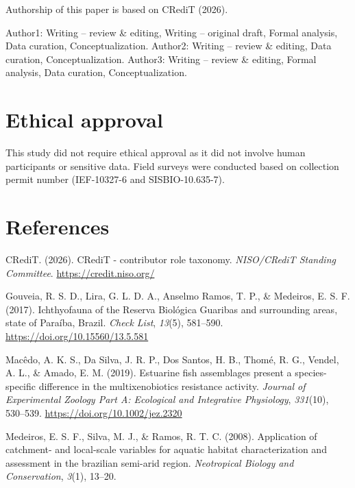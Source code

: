 \documentclass[
  american,
  letterpaper,
  DIV=11,
  numbers=noendperiod]{scrartcl}
\newlength{\cslhangindent}
\newenvironment{CSLReferences}[2] %
 {\begin{list}{}{%
  \setlength{\itemindent}{0pt}
  \setlength{\leftmargin}{0pt}
  \setlength{\parsep}{0pt}
  \ifodd #1
   \setlength{\leftmargin}{\cslhangindent}
   \setlength{\itemindent}{-1\cslhangindent}
  \fi
  \setlength{\itemsep}{#2\baselineskip}}}
 {\end{list}}
\begin{document}
Authorship of this paper is based on CRediT (2026).

Author1: Writing -- review \& editing, Writing -- original draft, Formal
analysis, Data curation, Conceptualization. Author2: Writing -- review
\& editing, Data curation, Conceptualization. Author3: Writing -- review
\& editing, Formal analysis, Data curation, Conceptualization.

\section*{Ethical approval}\label{ethical-approval}

This study did not require ethical approval as it did not involve human
participants or sensitive data. Field surveys were conducted based on
collection permit number (IEF-10327-6 and SISBIO-10.635-7).

\section*{References}\label{references}

\label{refs}
\begin{CSLReferences}{1}{0}
CRediT. (2026). CRediT - contributor role taxonomy. \emph{NISO/CRediT
Standing Committee}. \url{https://credit.niso.org/}

Gouveia, R. S. D., Lira, G. L. D. A., Anselmo Ramos, T. P., \& Medeiros,
E. S. F. (2017). Ichthyofauna of the Reserva Biológica Guaribas and
surrounding areas, state of Paraíba, Brazil. \emph{Check List},
\emph{13}(5), 581--590. \url{https://doi.org/10.15560/13.5.581}

Macêdo, A. K. S., Da Silva, J. R. P., Dos Santos, H. B., Thomé, R. G.,
Vendel, A. L., \& Amado, E. M. (2019). Estuarine fish assemblages
present a species{-}specific difference in the multixenobiotics
resistance activity. \emph{Journal of Experimental Zoology Part A:
Ecological and Integrative Physiology}, \emph{331}(10), 530--539.
\url{https://doi.org/10.1002/jez.2320}

Medeiros, E. S. F., Silva, M. J., \& Ramos, R. T. C. (2008). Application
of catchment- and local-scale variables for aquatic habitat
characterization and assessment in the brazilian semi-arid region.
\emph{Neotropical Biology and Conservation}, \emph{3}(1), 13--20.

\end{CSLReferences}
\end{document}
